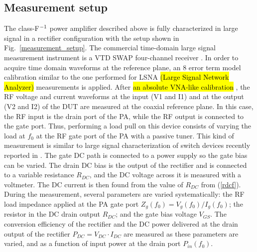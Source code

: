 \subsection {Measurement setup}
% 
The class-F$^{\rm -1}$ power amplifier described above is fully characterized in large signal in a rectifier configuration with the setup shown in Fig.~\ref{measurement_setup}. The commercial time-domain large signal measurement instrument is a VTD SWAP four-channel receiver \cite{SWAP}. In order to acquire time domain waveforms at the reference plane, an 8 error term model calibration similar to the one performed for LSNA \hl{(Large Signal Network Analyzer)} measurements is applied. After \hl{an absolute VNA-like calibration} \cite{verspecht}, the RF voltage and current waveforms at the input (V1 and I1) and at the output (V2 and I2) of the DUT are measured at the coaxial reference plane. In this case, the RF input is the drain port of the PA, while the RF output is connected to the gate port. Thus, performing a load pull on this device consists of varying the load at $f_0$ at the RF gate port of the PA with a passive tuner. This kind of measurement is similar to large signal characterization of switch devices recently reported in \cite{switch,faraj_arftg_2012}. The gate DC path is connected to a power supply so the gate bias can be varied. The drain DC bias is the output of the rectifier and is connected to a variable resistance $R_{DC}$, and the DC voltage across it is measured with a voltmeter. The DC current is then found from the value of $R_{DC}$ from (\ref{rdcf}). During the measurement, several parameters are varied systematically: the RF load impedance applied at the PA gate port $Z_g(f_0)=V_g(f_0)/I_g(f_0)$; the resistor in the DC drain output $R_{DC}$; and the gate bias voltage $V_{GS}$. The conversion efficiency of the rectifier and the DC power delivered at the drain output of the rectifier $P_{DC}= V_{DC} \cdot I_{DC}$ are measured as these parameters are varied, and as a function of input power at the drain port $P_{in}(f_0)$.





